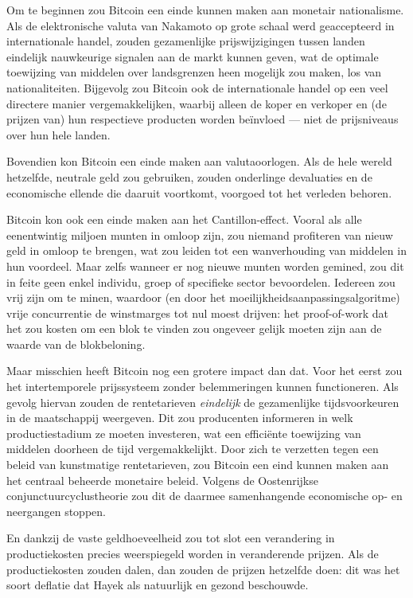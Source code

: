 \documentclass[
  a5paper,
  smalldemyvopaper,11pt,twoside,onecolumn,openright,extrafontsizes,
hidelinks]{memoir}
\begin{document}
Om te beginnen zou Bitcoin een einde kunnen maken aan monetair
nationalisme. Als de elektronische valuta van Nakamoto op grote schaal
werd geaccepteerd in internationale handel, zouden gezamenlijke
prijswijzigingen tussen landen eindelijk nauwkeurige signalen aan de
markt kunnen geven, wat de optimale toewijzing van middelen over
landsgrenzen heen mogelijk zou maken, los van nationaliteiten. Bijgevolg
zou Bitcoin ook de internationale handel op een veel directere manier
vergemakkelijken, waarbij alleen de koper en verkoper en (de prijzen
van) hun respectieve producten worden beïnvloed --- niet de prijsniveaus
over hun hele landen.

Bovendien kon Bitcoin een einde maken aan valutaoorlogen. Als de hele
wereld hetzelfde, neutrale geld zou gebruiken, zouden onderlinge
devaluaties en de economische ellende die daaruit voortkomt, voorgoed
tot het verleden behoren.

Bitcoin kon ook een einde maken aan het Cantillon-effect. Vooral als
alle eenentwintig miljoen munten in omloop zijn, zou niemand profiteren
van nieuw geld in omloop te brengen, wat zou leiden tot een
wanverhouding van middelen in hun voordeel. Maar zelfs wanneer er nog
nieuwe munten worden gemined, zou dit in feite geen enkel individu,
groep of specifieke sector bevoordelen. Iedereen zou vrij zijn om te
minen, waardoor (en door het moeilijkheidsaanpassingsalgoritme) vrije
concurrentie de winstmarges tot nul moest drijven: het proof-of-work dat
het zou kosten om een blok te vinden zou ongeveer gelijk moeten zijn aan
de waarde van de blokbeloning.

Maar misschien heeft Bitcoin nog een grotere impact dan dat. Voor het
eerst zou het intertemporele prijssysteem zonder belemmeringen kunnen
functioneren. Als gevolg hiervan zouden de rentetarieven
\emph{eindelijk} de gezamenlijke tijdsvoorkeuren in de maatschappij
weergeven. Dit zou producenten informeren in welk productiestadium ze
moeten investeren, wat een efficiënte toewijzing van middelen doorheen
de tijd vergemakkelijkt. Door zich te verzetten tegen een beleid van
kunstmatige rentetarieven, zou Bitcoin een eind kunnen maken aan het
centraal beheerde monetaire beleid. Volgens de Oostenrijkse
conjunctuurcyclustheorie zou dit de daarmee samenhangende economische
op- en neergangen stoppen.

En dankzij de vaste geldhoeveelheid zou tot slot een verandering in
productiekosten precies weerspiegeld worden in veranderende prijzen. Als
de productiekosten zouden dalen, dan zouden de prijzen hetzelfde doen:
dit was het soort deflatie dat Hayek als natuurlijk en gezond
beschouwde.
\end{document}

